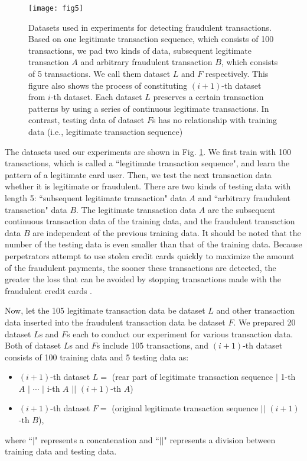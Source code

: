 \documentclass[final,authoryear,5p,times,twocolumn]{elsarticle}
\begin{document}
\begin{figure}[h!]
\begin{center}
\texttt{[image: fig5]}
\caption{Datasets used in experiments for detecting fraudulent transactions. Based on one legitimate transaction sequence, which consists of 100 transactions, we pad two kinds of data, subsequent legitimate transaction $A$ and arbitrary fraudulent transaction $B$, which consists of 5 transactions. We call them dataset $L$ and $F$ respectively. This figure also shows the process of constituting $(i+1)$-th dataset from $i$-th dataset. Each dataset $L$ preserves a certain transaction patterns by using a series of continuous legitimate transactions. In contrast, testing data of dataset $F$s has no relationship with training data (i.e., legitimate transaction sequence)}
\label{fig:F3}
\end{center}
\end{figure}

The datasets used our experiments are shown in Fig. \ref{fig:F3}. We first train with 100 transactions, which is called a ``legitimate transaction sequence", and learn the pattern of a legitimate card user. Then, we test the next transaction data whether it is legitimate or fraudulent. There are two kinds of testing data with length 5: ``subsequent legitimate transaction" data $A$ and ``arbitrary fraudulent transaction" data $B$. The legitimate transaction data $A$ are the subsequent continuous transaction data of the training data, and the fraudulent transaction data $B$ are independent of the previous training data. It should be noted that the number of the testing data is even smaller than that of the training data. Because perpetrators attempt to use stolen credit cards quickly to maximize the amount of the fraudulent payments, the sooner these transactions are detected, the greater the loss that can be avoided by stopping transactions made with the fraudulent credit cards \citep{ref3}.

Now, let the 105 legitimate transaction data be dataset $L$ and other transaction data inserted into the fraudulent transaction data be dataset $F$. We prepared 20 dataset $L$s and $F$s each to conduct our experiment for various transaction data. Both of dataset $L$s and $F$s include 105 transactions, and $(i+1)$-th dataset consists of 100 training data and 5 testing data as:
\begin{itemize}
\item $(i+1)$-th dataset $L =$ (rear part of legitimate transaction sequence $|$ 1-th $A$ $|$ $\cdots$ $|$ i-th $A$ $||$ $(i+1)$-th $A$)
\item $(i+1)$-th dataset $F =$ (original legitimate transaction sequence $||$ $(i+1)$-th $B$),
\end{itemize}
where ``$|$" represents a concatenation and ``$||$" represents a division between training data and testing data.
\end{document}

